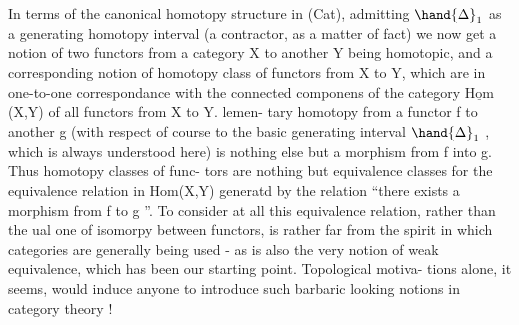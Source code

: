 In terms of the canonical homotopy structure in (Cat),  admitting
$\hand{\Delta}_1$ as a generating homotopy interval (a contractor,  as a matter of fact)\hand{,}
we now get a notion of two functors from a category X to another Y
being homotopic,  and a corresponding notion of homotopy class of functors
from X to Y,  which are in one-to-one correspondance with the connected
componens of the category $\underline{\mathrm{Hom}}$(X,Y) of all functors from X to Y.  lemen-%
tary homotopy from a functor f to another g  (with respect of course to
the basic generating interval $\hand{\Delta}_1$ ,  which is always understood here) is
nothing else but a morphism from f into g.  Thus homotopy classes of func-%
tors are nothing but equivalence classes for the equivalence relation in
Hom(X,Y)  generatd by the relation  ``there exists a morphism from f to
g ''.  To consider at all this equivalence relation,  rather than the ual
one of isomorpy between functors,  is rather far from the spirit in which
categories are generally being used  -   as is also the very notion of
 weak equivalence,  which has been our starting point.  Topological motiva-%
tions alone,  it seems,  would induce anyone to introduce such barbaric
looking notions in category theory !


